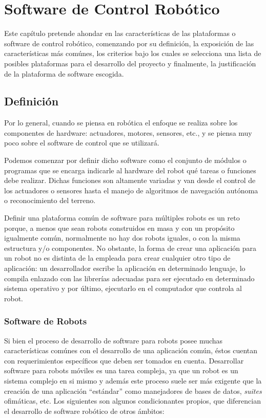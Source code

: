 \chapter{Software de Control Robótico}

Este capítulo pretende ahondar en las características de las plataformas o software de control robótico, comenzando por su definición, la exposición de las características más comúnes, los criterios bajo los cuales se selecciona una lista de posibles plataformas para el desarrollo del proyecto y finalmente, la justificación de la plataforma de software escogida.

\section{Definición}

Por lo general, cuando se piensa en robótica el enfoque se realiza sobre los componentes de hardware: actuadores, motores, sensores, etc., y se piensa muy poco sobre el software de control que se utilizará.

Podemos comenzar por definir dicho software como el conjunto de módulos o programas que se encarga indicarle al hardware del robot qué tareas o funciones debe realizar. Dichas funciones son altamente variadas y van desde el control de los actuadores o sensores hasta el manejo de algoritmos de navegación autónoma o reconocimiento del terreno.

Definir una plataforma común de software para múltiples robots es un reto porque, a menos que sean robots construidos en masa y con un propósito igualmente común, normalmente no hay dos robots iguales, o con la misma estructura y/o componentes. No obstante, la forma de crear una aplicación para un robot no es distinta de la empleada para crear cualquier otro tipo de aplicación: un desarrollador escribe la aplicación en determinado lenguaje, lo compila enlazado con las librerías adecuadas para ser ejecutado en determinado sistema operativo y por último, ejecutarlo en el computador que controla al robot.

\subsection{Software de Robots}

Si bien el proceso de desarrollo de software para robots posee muchas características comúnes con el desarrollo de una aplicación común, éstos cuentan con requerimientos específicos que deben ser tomados en cuenta. Desarrollar software para robots móviles es una tarea compleja, ya que un robot es un sistema complejo en si mismo y además este proceso suele ser más exigente que la creación de una aplicación ``estándar'' como manejadores de bases de datos, \textit{suites} ofimáticas, etc. Los siguientes son algunos condicionantes propios, que diferencian el desarrollo de software robótico de otros ámbitos:

